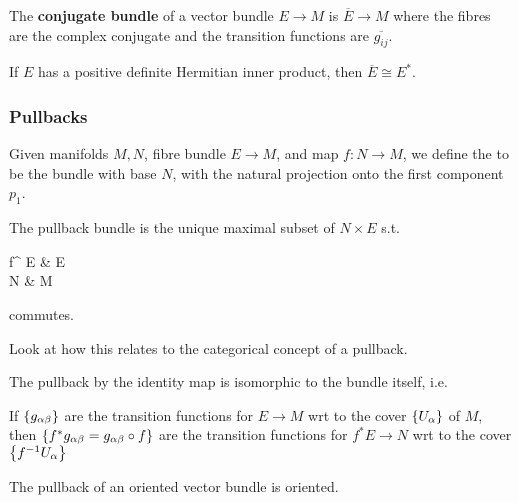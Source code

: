 \documentclass{article}
\begin{document}
\begin{definition}
	The \textbf{conjugate bundle} of a vector bundle $E \to M$ is $\overline{E} \to M$ where the fibres are the complex conjugate and the transition functions are $\overline{g_{ij}}$. 
\end{definition}

\begin{prop}
	If $E$ has a positive definite Hermitian inner product, then $\overline{E} \cong E^\ast$. 
\end{prop}

\subsubsection{Pullbacks}

\begin{definition}
	Given manifolds $M,N$, fibre bundle $E \to M$, and map $f:N \to M$, we define the  to be 
	the bundle with base $N$, with the natural projection onto the first component $p_1$. 
\end{definition}

\begin{lemma}
	The pullback bundle is the unique maximal subset of $N \times E$ s.t. 
	\begin{tkz}
		f^{\ast} E \arrow[r,"p_2"] \arrow[d,"p_1"'] & E \arrow[d,"\pi"] \\
		N \arrow[r,"f"'] & M
	\end{tkz} 
	commutes.
\end{lemma}

\begin{ex}
	Look at how this relates to the categorical concept of a pullback. 
\end{ex}

\begin{example}
	The pullback by the identity map is isomorphic to the bundle itself, i.e. 
\end{example}

\begin{prop}
	If $\left\{ g_{\alpha\beta} \right\}$ are the transition functions for $E\to M$ wrt to the cover $\left\{ U_\alpha \right\}$ of $M$, then $\left\{ f^\ast g_{\alpha\beta} = g_{\alpha\beta}\circ f \right\}$ are the transition functions for $f^\ast E \to N$ wrt to the cover $\left\{ f^{-1}U_\alpha \right\}$
\end{prop}
\begin{corollary}
	The pullback of an oriented vector bundle is oriented. 	
\end{corollary}
\end{document}
